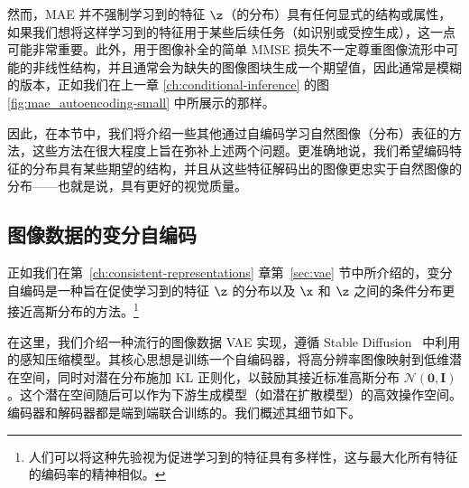\documentclass[../../book-main_zh.tex]{subfiles}
\begin{document}
然而，MAE 并不强制学习到的特征 $\z$（的分布）具有任何显式的结构或属性，如果我们想将这样学习到的特征用于某些后续任务（如识别或受控生成），这一点可能非常重要。此外，用于图像补全的简单 MMSE 损失不一定尊重图像流形中可能的非线性结构，并且通常会为缺失的图像图块生成一个期望值，因此通常是模糊的版本，正如我们在上一章 \ref{ch:conditional-inference} 的图 \ref{fig:mae_autoencoding-small} 中所展示的那样。

因此，在本节中，我们将介绍一些其他通过自编码学习自然图像（分布）表征的方法，这些方法在很大程度上旨在弥补上述两个问题。更准确地说，我们希望编码特征的分布具有某些期望的结构，并且从这些特征解码出的图像更忠实于自然图像的分布——也就是说，具有更好的视觉质量。


\subsection{图像数据的变分自编码}





\label{sec:VAE-implement}


正如我们在第~\ref{ch:consistent-representations} 章第~\ref{sec:vae} 节中所介绍的，变分自编码是一种旨在促使学习到的特征 $\z$ 的分布以及 $\x$ 和 $\z$ 之间的条件分布更接近高斯分布的方法。\footnote{人们可以将这种先验视为促进学习到的特征具有多样性，这与最大化所有特征的编码率的精神相似。}

在这里，我们介绍一种流行的图像数据 VAE 实现，遵循 Stable Diffusion~\citep{rombach2022high} 中利用的感知压缩模型。其核心思想是训练一个自编码器，将高分辨率图像映射到低维潜在空间，同时对潜在分布施加 KL 正则化，以鼓励其接近标准高斯分布 $\mathcal{N}(\boldsymbol{0}, \boldsymbol{I})$。这个潜在空间随后可以作为下游生成模型（如潜在扩散模型）的高效操作空间。编码器和解码器都是端到端联合训练的。我们概述其细节如下。
\end{document}
